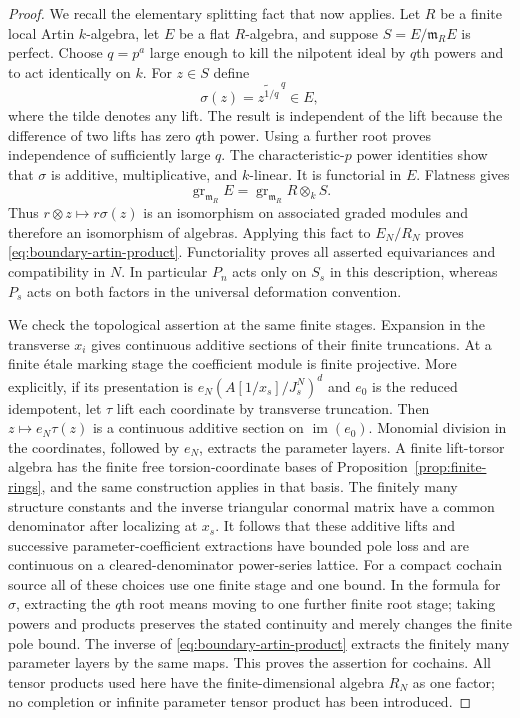 \begin{proof}
We recall the elementary splitting fact that now applies.  Let $R$
be a finite local Artin $k$-algebra, let $E$ be a flat $R$-algebra,
and suppose $S=E/\mathfrak m_RE$ is perfect.  Choose $q=p^a$ large
enough to kill the nilpotent ideal by $q$th powers and to act
identically on $k$.  For $z\in S$ define
\[
 \sigma(z)=\widetilde{z^{1/q}}^{\,q}\in E,
\]
where the tilde denotes any lift.  The result is independent of the
lift because the difference of two lifts has zero $q$th power.
Using a further root proves independence of sufficiently large $q$.
The characteristic-$p$ power identities show that $\sigma$ is
additive, multiplicative, and $k$-linear.  It is functorial in $E$.
Flatness gives
\[
 \operatorname{gr}_{\mathfrak m_R} E
   =\operatorname{gr}_{\mathfrak m_R}R\otimes_k S.
\]
Thus $r\otimes z\mapsto r\sigma(z)$ is an isomorphism on associated
graded modules and therefore an isomorphism of algebras.  Applying
this fact to $E_N/R_N$ proves
\eqref{eq:boundary-artin-product}.  Functoriality proves all asserted
equivariances and compatibility in $N$.  In particular $P_n$ acts
only on $S_s$ in this description, whereas $P_s$ acts on both factors
in the universal deformation convention.

We check the topological assertion at the same finite stages.
Expansion in the transverse $x_i$ gives continuous additive sections
of their finite truncations.  At a finite \'etale marking stage the
coefficient module is finite projective.  More explicitly, if its
presentation is $e_N(A[1/x_s]/J_s^N)^d$ and $e_0$ is the reduced
idempotent, let $\tau$ lift each coordinate by transverse truncation.
Then $z\mapsto e_N\tau(z)$ is a continuous additive section on
$\operatorname{im}(e_0)$.  Monomial division in the coordinates,
followed by $e_N$, extracts the parameter layers.  A finite
lift-torsor algebra
has the finite free torsion-coordinate bases of
Proposition~\ref{prop:finite-rings}, and the same construction applies
in that basis.  The finitely many structure constants and the
inverse triangular conormal matrix have a common denominator after
localizing at $x_s$.  It follows that these additive lifts and
successive parameter-coefficient extractions have bounded pole loss
and are continuous on a cleared-denominator power-series lattice.
For a compact cochain source all of these choices use one finite
stage and one bound.  In the formula for $\sigma$, extracting the
$q$th root means moving to one further finite root stage; taking
powers and products preserves the stated continuity and merely
changes the finite pole bound.  The inverse of
\eqref{eq:boundary-artin-product} extracts the finitely many parameter
layers by the same maps.  This proves the assertion for cochains.
All tensor products used here have the finite-dimensional algebra
$R_N$ as one factor; no completion or infinite parameter tensor
product has been introduced.
\end{proof}

